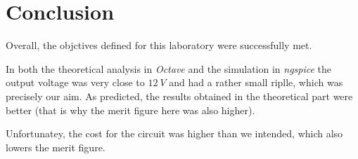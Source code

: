 
\section{Conclusion}
\label{sec:conclusion}

Overall, the objctives defined for this laboratory were successfully met.

In both the theoretical analysis in \textit{Octave} and the simulation in \textit{ngspice} the output voltage was very close to $12 \ V$ and had a rather small riplle, which was precisely our aim. As predicted, the results obtained in the theoretical part were better (that is why the merit figure here was also higher).

Unfortunatey, the cost for the circuit was higher than we intended, which also lowers the merit figure.
